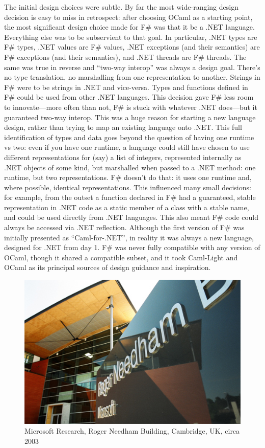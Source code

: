 \documentclass[acmsmall]{acmart}\settopmatter{}
\begin{document}
The initial design choices were subtle.  By far the most wide-ranging design decision is easy to miss in retrospect: after choosing OCaml as a
starting point, the most significant design choice made for F\# was that it be a .NET language.  Everything else was to be subservient to
that goal.  In particular, .NET types are F\# types, .NET values are F\# values, .NET exceptions (and their semantics) are F\# exceptions
(and their semantics), and .NET threads are F\# threads.  The same was true in reverse and “two-way interop” was always a design goal.
There’s no type translation, no marshalling from one representation to another. Strings in F\# were to be strings in .NET and vice-versa.
Types and functions defined in F\# could be used from other .NET languages. This decision gave F\# less room to innovate---more often
than not, F\# is stuck with whatever .NET does---but it guaranteed two-way interop.  This was a huge reason for starting a new language
design, rather than trying to map an existing language onto .NET.  This full identification of types and data goes beyond the question of
having one runtime vs two: even if you have one runtime, a language could still have chosen to use different representations for (say) a
list of integers, represented internally as .NET objects of some kind, but marshalled when passed to a .NET method: one runtime, but two
representations. F\# doesn’t do that: it uses one runtime and, where possible, identical representations. This influenced many small decisions: for
example, from the outset a function declared in F\# had a guaranteed, stable representation in .NET code as a static member of a class with a
stable name, and could be used directly from .NET languages.  This also meant F\# code could always be accessed via .NET reflection.  Although
the first version of F\# was initially presented as “Caml-for-.NET”, in reality it was always a new language, designed for .NET from day 1. F\# was never
fully compatible with any version of OCaml, though it shared a compatible subset, and it took Caml-Light and OCaml as its principal sources of design guidance and inspiration.  

\begin{figure}
  \begin{center}
  \includegraphics[width=0.9\linewidth]{msft.jpg}
  \end{center}
  \caption{Microsoft Research, Roger Needham Building, Cambridge, UK, circa 2003}
  \label{fig:msft}
\end{figure}
\end{document}
